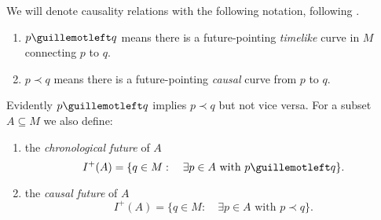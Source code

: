 We will denote causality relations with the following notation, following \cite{o1983semi}.
\begin{enumerate}
	\item  \(p \guillemotleft q\) means there is a future-pointing \emph{timelike} curve in \(M\) connecting \(p\) to \(q\).
	\item \(p \prec q\) means there is a future-pointing \emph{causal} curve from \(p\) to \(q\).
\end{enumerate}

Evidently \(p\guillemotleft q\) implies \(p\prec q\) but not vice versa. For a subset \(A \subseteq M\) we also define:
\begin{enumerate}
	\item the \emph{chronological future} of \(A\)
	\[
	I^+(A) =\{ q\in M :\quad\exists p \in A\text{ with } p\guillemotleft q\}.
	\]
	\item the \emph{causal future} of \(A\)
	\[
	I^+(A) =\{ q\in M : \quad\exists p \in A\text{ with } p\prec q\}.
	\]
\end{enumerate}
